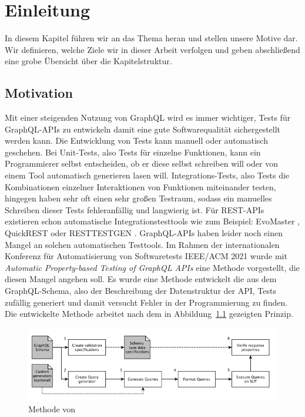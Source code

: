 \chapter{Einleitung}

In diesem Kapitel führen wir an das Thema heran und stellen unsere Motive dar.
Wir definieren, welche Ziele wir in dieser Arbeit verfolgen und geben abschließend eine grobe Übersicht über die
Kapitelstruktur.

\section{Motivation}

Mit einer steigenden Nutzung von GraphQL wird es immer wichtiger, Tests für GraphQL-APIs zu entwickeln damit eine
gute Softwarequalität sichergestellt werden kann.
Die Entwicklung von Tests kann manuell oder automatisch geschehen.
Bei Unit-Tests, also Tests für einzelne Funktionen, kann ein Programmierer selbst entscheiden, ob er diese selbst schreiben will
oder von einem Tool automatisch generieren lasen will.
Integrations-Tests, also Tests die Kombinationen einzelner Interaktionen von Funktionen miteinander testen, hingegen haben sehr oft
einen sehr großen Testraum, sodass ein manuelles Schreiben dieser Tests fehleranfällig und langwierig ist.
Für REST-APIs existieren schon automatische Integrationstesttools wie zum Beispiel: EvoMaster \cite{evo-master} , QuickREST \cite{karlsson2019quickrest} oder RESTTESTGEN \cite{rest-test-gen}.
GraphQL-APIs haben leider noch einen Mangel an solchen automatischen Testtools.
Im Rahmen der internationalen  Konferenz für Automatisierung  von  Softwaretests IEEE/ACM 2021 wurde mit
\textit{Automatic Property-based Testing of GraphQL APIs}\cite{property-based-testing} eine Methode vorgestellt, die diesen Mangel angehen soll.
Es wurde eine Methode entwickelt die aus dem GraphQL-Schema, also der Beschreibung der Datenstruktur der API, Tests zufällig generiert und damit versucht Fehler in der Programmierung zu finden.
Die entwickelte Methode arbeitet nach dem in Abbildung~\ref{property-based-method} gezeigten Prinzip.

\begin{figure}[h!]
    \centering
    \includegraphics[width=\textwidth,height=\textheight,keepaspectratio]{content/einleitung/toolchain}
    \caption{Methode von~\cite{property-based-testing}}
    \label{property-based-method}
\end{figure}
\newpage

